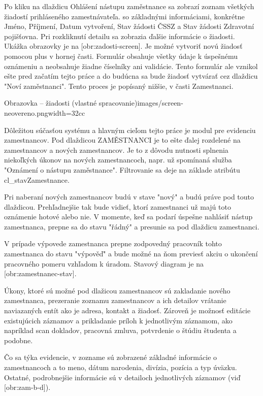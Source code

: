 Po kliku na dlaždicu Ohlášení nástupu zaměstnance sa zobrazí zoznam všetkých žiadostí prihláseného zamestnávateľa. so základnými informáciami, konkrétne Jméno, Příjmení, Datum vytvoření, Stav žádosti ČSSZ a Stav žádosti Zdravotní pojišťovna. Pri rozkliknutí detailu sa zobrazia ďalšie informácie o žiadosti. Ukážka obrazovky je na [obr:zadosti-screen]. Je možné vytvoriť novú žiadosť pomocou plus v hornej časti. Formulár obsahuje všetky údaje k úspešnému oznámeniu a neobsahuje žiadne číselníky ani validácie. Tento formulár ale vznikol ešte pred začatím tejto práce a do budúcna sa bude žiadosť vytvárať cez dlaždicu "Noví zaměstnanci". Tento proces je popísaný nižšie, v časti Zamestnanci.

{Obrazovka -- žiadosti (vlastné spracovanie)}{images/screen-neovereno.png}{width=32cc}


Dôležitou súčasťou systému a hlavným cieľom tejto práce je modul pre evidenciu zamestnancov. Pod dlaždicou ZAMĚSTNANCI je to ešte ďalej rozdelené na zamestnancov a nových zamestnancov. Je to z dôvodu nutnosti splnenia niekoľkých úkonov na nových zamestnancoch, napr. už spomínaná služba "Oznámení o nástupu zaměstnance". Filtrovanie sa deje na základe atribútu cl_stavZamestnance.

Pri naberaní nových zamestnancov budú v stave "nový" a budú práve pod touto dlaždicou. Prehľadnejšie tak bude vidieť, ktorí zamestnanci už majú toto oznámenie hotové alebo nie. V momente, keď sa podarí úspešne nahlásiť nástup zamestnanca, prepne sa do stavu "řádný" a presunie sa pod dlaždicu zamestnanci.

V prípade výpovede zamestnanca prepne zodpovedný pracovník tohto zamestnanca do stavu "výpověď" a bude možné na ňom previesť akciu o ukončení pracovného pomeru vzhľadom k úradom. Stavový diagram je na [obr:zamestnanec-stav].

Úkony, ktoré sú možné pod dlažicou zamestnancov sú zakladanie nového zamestnanca, prezeranie zoznamu zamestnancov a ich detailov vrátanie naviazaných entít ako je adresa, kontakt a žiadosť. Zároveň je možnosť editácie existujúcich záznamov a prikladanie príloh k jednotlivým záznamom, ako napríklad scan dokladov, pracovná zmluva, potvrdenie o štúdiu študenta a podobne.

Čo sa týka evidencie, v zozname sú zobrazené základné informácie o zamestnancoch a to meno, dátum narodenia, divízia, pozícia a typ úväzku. Ostatné, podrobnejšie informácie sú v detailoch jednotlivých záznamov (viď [obr:zam-b-d]).

